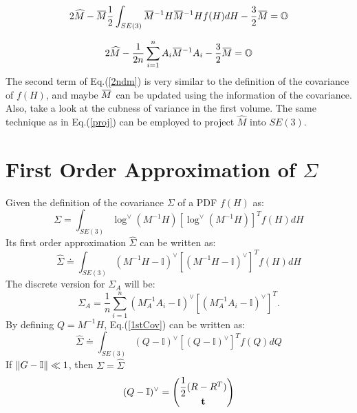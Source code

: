 \documentclass[twocolumn,10pt]{asme2ej}
\DeclarePairedDelimiter{\norm}{\lVert}{\rVert}
\newcommand{\II}{\mathbb{I}}
\newcommand{\overbar}[1]{\mkern 1.5mu\overline{\mkern-1.5mu#1\mkern-1.5mu}\mkern 1.5mu}
\newcommand{\ttt}{{\bf t}}
\begin{document}
\begin{equation}
2\widehat{M} - \overbar{M}\dfrac{1}{2}\int_{SE(3)}\overbar{M}^{-1}H\overbar{M}^{-1}Hf(H)dH - \dfrac{3}{2}\overbar{M} = \mathbb{O}
\label{2ndm}
\end{equation}

\begin{equation}
2\widehat{M} - \dfrac{1}{2n}\sum_{i=1}^{n}A_{i}\overbar{M}^{-1}A_{i} - \dfrac{3}{2}\overbar{M} = \mathbb{O}
\label{2ndm}
\end{equation}
The second term of Eq.(\ref{2ndm}) is very similar to the definition of the covariance of $f(H)$, and maybe  $\overbar{M}$ can be updated using the information of the covariance. Also, take a look at the cubness of variance in the first volume. 
The same technique as in Eq.(\ref{proj}) can be employed to project $\widehat{M}$ into $SE(3)$.

\section{First Order Approximation of $\Sigma$}
Given the definition of the covariance $\Sigma$ of a PDF $f(H)$ as:
\begin{equation} 
\Sigma = \int_{SE(3)} \log^{\vee}(M^{-1} H) [\log^{\vee}(M^{-1} H)]^T  f(H) dH \label{meancovdef} \end{equation}
Its first order approximation $\widehat{\Sigma}$ can be written as:
\begin{equation}
\widehat{\Sigma} \doteq \int_{SE(3)} (M^{-1} H - \II)^{\vee} [(M^{-1} H - \II)^{\vee}]^T  f(H) dH
\label{1stCov}
\end{equation}
The discrete version for $\Sigma_{A}$ will be:
\begin{equation}
\Sigma_A = \frac{1}{n} \sum_{i=1}^{n} (M_A^{-1} A_i- \II)^{\vee} [(M_A^{-1} A_i- \II)^{\vee}]^T.  
\end{equation}
By defining $Q = M^{-1}H$, Eq.(\ref{1stCov}) can be written as:
\begin{equation}
\widehat{\Sigma} \doteq \int_{SE(3)} (Q - \II)^{\vee} [(Q - \II)^{\vee}]^T  f(Q) dQ
\end{equation}
If $\norm{G - \II} \ll 1$, then $\Sigma = \widehat{\Sigma}$
\begin{equation}
(Q - \II)^{\vee} =
\left( 
\begin{matrix}
\dfrac{1}{2}(R -R^{T}) \\
\ttt
\end{matrix}
\right)
\end{equation}
\end{document}
